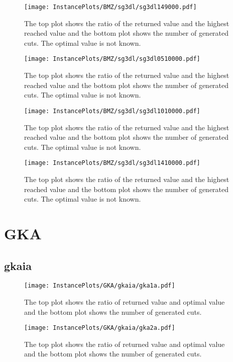 \documentclass[10pt,a4paper]{article}
\begin{document}
\begin{figure}[H]
\texttt{[image: InstancePlots/BMZ/sg3dl/sg3dl149000.pdf]}
\caption{The top plot shows the ratio of the returned value and the highest reached value     and the bottom plot shows the number of generated cuts. The optimal value is not known.}
\end{figure}

\begin{figure}[H]
\texttt{[image: InstancePlots/BMZ/sg3dl/sg3dl0510000.pdf]}
\caption{The top plot shows the ratio of the returned value and the highest reached value     and the bottom plot shows the number of generated cuts. The optimal value is not known.}
\end{figure}

\begin{figure}[H]
\texttt{[image: InstancePlots/BMZ/sg3dl/sg3dl1010000.pdf]}
\caption{The top plot shows the ratio of the returned value and the highest reached value     and the bottom plot shows the number of generated cuts. The optimal value is not known.}
\end{figure}

\begin{figure}[H]
\texttt{[image: InstancePlots/BMZ/sg3dl/sg3dl1410000.pdf]}
\caption{The top plot shows the ratio of the returned value and the highest reached value     and the bottom plot shows the number of generated cuts. The optimal value is not known.}
\end{figure}

\section{GKA}
\subsection{gkaia}
\begin{figure}[H]
\texttt{[image: InstancePlots/GKA/gkaia/gka1a.pdf]}
\caption{The top plot shows the ratio of returned value and optimal value     and the bottom plot shows the number of generated cuts.}
\end{figure}

\begin{figure}[H]
\texttt{[image: InstancePlots/GKA/gkaia/gka2a.pdf]}
\caption{The top plot shows the ratio of returned value and optimal value     and the bottom plot shows the number of generated cuts.}
\end{figure}
\end{document}
